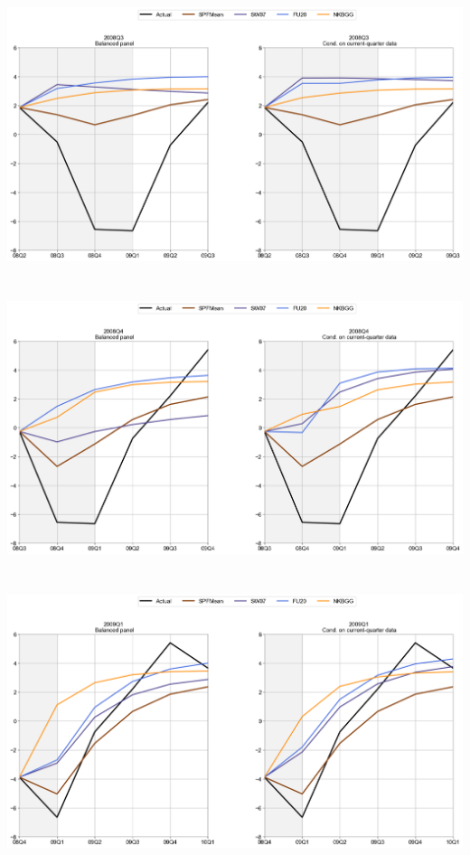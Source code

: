 \documentclass{article}
\begin{document}
\includegraphics[scale=0.5]{Top3_models_2008Q3}\\ \bigskip \\ \bigskip  \\
\includegraphics[scale=0.5]{Top3_models_2008Q4}\\  \bigskip \\ \bigskip  \\
\includegraphics[scale=0.5]{Top3_models_2009Q1}\\  \bigskip \\ \bigskip  \\
\end{document}
